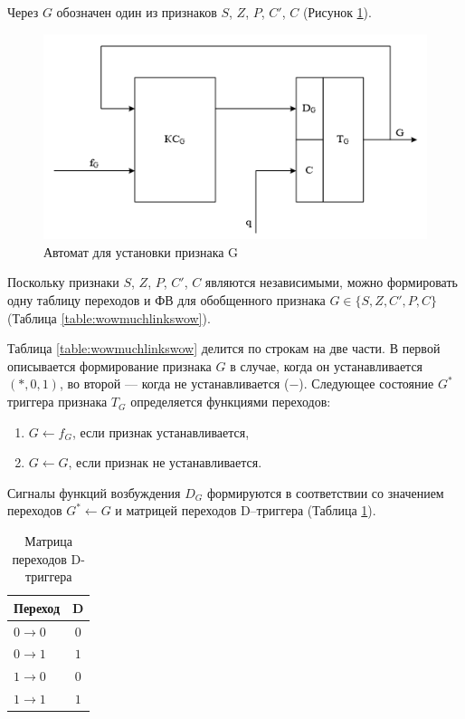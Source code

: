 Через $G$ обозначен один из признаков $S$, $Z$, $P$, $C'$, $C$  (Рисунок \ref{figure:oa2}).

\begin{figure}[H]
	\includegraphics[scale=0.6]{images/oa2.png}
	\caption{Автомат для установки признака G}
	\label{figure:oa2}
\end{figure}

Поскольку признаки $S$, $Z$, $P$, $C'$, $C$ являются независимыми, можно формировать одну таблицу переходов и ФВ для обобщенного признака $G \in \{S, Z, C', P ,C\}$ (Таблица \ref{table:wowmuchlinkswow}). 

Таблица \ref{table:wowmuchlinkswow} делится по строкам на две части. В первой описывается формирование признака $G$ в случае, когда он устанавливается $(*, 0 ,1)$, во второй --- когда не устанавливается ($-$). Следующее состояние $G^*$ триггера признака $T_G$ определяется функциями переходов:
\begin{enumerate}
	\item $G \leftarrow f_G$, если признак устанавливается,
	\item $G \leftarrow G$, если признак не устанавливается.
\end{enumerate}

Сигналы функций возбуждения $D_G$ формируются в соответствии со значением переходов $G^* \leftarrow G$ и матрицей переходов D–триггера (Таблица \ref{table:D_SMW}).

\begin{table}[H]
	\centering
	\caption{Матрица переходов D-триггера}
	\label{table:D_SMW}
	\begin{tabular}{| l | c |} \hline
		Переход & D\\ \hline
		$0 \rightarrow 0$ & 	$0$ \\ \hline
		$0 \rightarrow 1$ & 	$1$\\ \hline
		$1 \rightarrow 0$ & 	$0$ \\ \hline
		$1 \rightarrow 1$ & 	$1$ \\ \hline
	\end{tabular}
\end{table}

